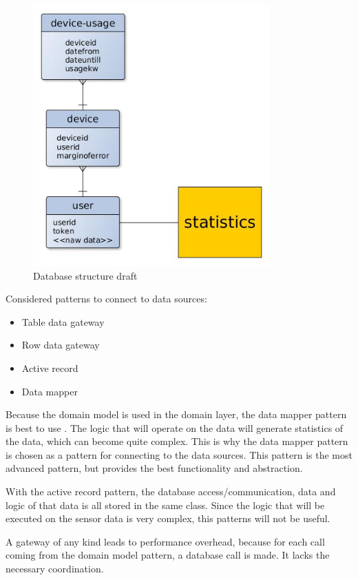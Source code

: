 \begin{figure}[H]
\caption{Database structure draft}
\centering
\includegraphics[height=10cm]{4-analysis/images/SoftwarePatternsDatabaseDraft.jpg}
\end{figure}

Considered patterns to connect to data sources:
\begin{itemize}
\item Table data gateway%
\item Row data gateway%
\item Active record %
\item Data mapper%
\end{itemize}

Because the domain model is used in the domain layer, the data mapper pattern is best to use . 
The logic that will operate on the data will generate statistics of the data, which can become quite complex. This is why the data mapper pattern is chosen as a pattern for connecting to the data sources. This pattern is the most advanced pattern, but provides the best functionality and abstraction.

With the active record pattern, the database access/communication, data and logic of that data is all stored in the same class. Since the logic that will be executed on the sensor data is very complex, this patterns will not be useful.

A gateway of any kind leads to performance overhead, because for each call coming from the domain model pattern, a database call is made. It lacks the necessary coordination.
%
%
%

